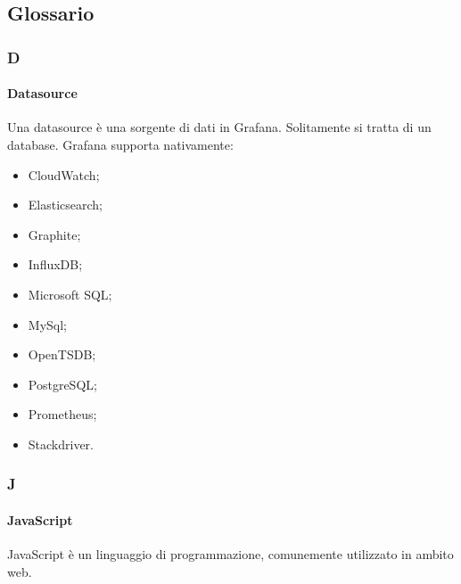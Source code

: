 \subsection{Glossario}
\subsubsection{D}

\paragraph{Datasource} \Spazio
\label{sec:datasource} 
Una datasource è una sorgente di dati in Grafana. Solitamente si tratta di un database. Grafana supporta nativamente:
	\begin{itemize}
	\item CloudWatch;
	\item Elasticsearch;
	\item Graphite;
	\item InfluxDB;
	\item Microsoft SQL;
	\item MySql;
	\item OpenTSDB;
	\item PostgreSQL;
	\item Prometheus;
	\item Stackdriver.
	\end{itemize}


\subsubsection{J}

	\paragraph{JavaScript} \Spazio
	\label{sec:javascript}
	JavaScript è un linguaggio di programmazione, comunemente utilizzato in ambito web.